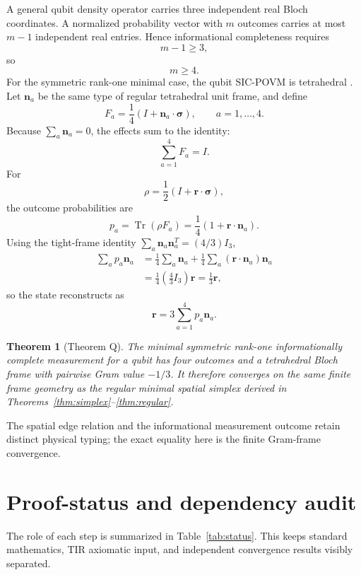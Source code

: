 \documentclass[12pt,a4paper]{article}
\newtheorem{theorem}{Theorem}[section]
\newcommand{\Tr}{\operatorname{Tr}}
\newcommand{\sigmavec}{\bm{\sigma}}
\newcommand{\rvec}{\bm{r}}
\newcommand{\nvec}{\bm{n}}
\begin{document}
A general qubit density operator carries three independent real Bloch coordinates. A normalized probability vector with $m$ outcomes carries at most $m-1$ independent real entries. Hence informational completeness requires
\[
m-1\ge3,
\]
so
\[
\boxed{m\ge4.}
\]
For the symmetric rank-one minimal case, the qubit SIC-POVM is tetrahedral \cite{RenesEtAl}. Let $\nvec_a$ be the same type of regular tetrahedral unit frame, and define
\[
\boxed{
F_a=\frac14\left(I+\nvec_a\cdot\sigmavec\right),\qquad a=1,\ldots,4.
}
\]
Because $\sum_a\nvec_a=0$, the effects sum to the identity:
\[
\sum_{a=1}^{4}F_a=I.
\]
For
\[
\rho=\frac12\left(I+\rvec\cdot\sigmavec\right),
\]
the outcome probabilities are
\[
\boxed{
p_a=\Tr(\rho F_a)=\frac14\left(1+\rvec\cdot\nvec_a\right).
}
\]
Using the tight-frame identity $\sum_a\nvec_a\nvec_a^T=(4/3)I_3$,
\begin{align*}
\sum_a p_a\nvec_a
&=\frac14\sum_a\nvec_a+\frac14\sum_a(\rvec\cdot\nvec_a)\nvec_a\\
&=\frac14\left(\frac43 I_3\right)\rvec
=\frac13\rvec,
\end{align*}
so the state reconstructs as
\[
\boxed{\rvec=3\sum_{a=1}^{4}p_a\nvec_a.}
\]

\begin{theorem}[Theorem Q]
The minimal symmetric rank-one informationally complete measurement for a qubit has four outcomes and a tetrahedral Bloch frame with pairwise Gram value $-1/3$. It therefore converges on the same finite frame geometry as the regular minimal spatial simplex derived in Theorems~\ref{thm:simplex}--\ref{thm:regular}.
\end{theorem}

The spatial edge relation and the informational measurement outcome retain distinct physical typing; the exact equality here is the finite Gram-frame convergence.

\section{Proof-status and dependency audit}

The role of each step is summarized in Table~\ref{tab:status}. This keeps standard mathematics, TIR axiomatic input, and independent convergence results visibly separated.
\end{document}
